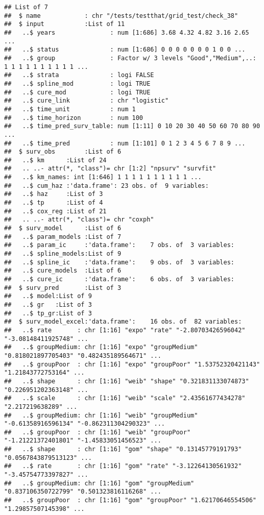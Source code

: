 \documentclass[
]{article}
\begin{document}
\begin{verbatim}
## List of 7
##  $ name            : chr "/tests/testthat/grid_test/check_38"
##  $ input           :List of 11
##   ..$ years               : num [1:686] 3.68 4.32 4.82 3.16 2.65 ...
##   ..$ status              : num [1:686] 0 0 0 0 0 0 0 1 0 0 ...
##   ..$ group               : Factor w/ 3 levels "Good","Medium",..: 1 1 1 1 1 1 1 1 1 1 ...
##   ..$ strata              : logi FALSE
##   ..$ spline_mod          : logi TRUE
##   ..$ cure_mod            : logi TRUE
##   ..$ cure_link           : chr "logistic"
##   ..$ time_unit           : num 1
##   ..$ time_horizon        : num 100
##   ..$ time_pred_surv_table: num [1:11] 0 10 20 30 40 50 60 70 80 90 ...
##   ..$ time_pred           : num [1:101] 0 1 2 3 4 5 6 7 8 9 ...
##  $ surv_obs        :List of 6
##   ..$ km      :List of 24
##   .. ..- attr(*, "class")= chr [1:2] "npsurv" "survfit"
##   ..$ km_names: int [1:646] 1 1 1 1 1 1 1 1 1 1 ...
##   ..$ cum_haz :'data.frame': 23 obs. of  9 variables:
##   ..$ haz     :List of 3
##   ..$ tp      :List of 4
##   ..$ cox_reg :List of 21
##   .. ..- attr(*, "class")= chr "coxph"
##  $ surv_model      :List of 6
##   ..$ param_models :List of 7
##   ..$ param_ic     :'data.frame':    7 obs. of  3 variables:
##   ..$ spline_models:List of 9
##   ..$ spline_ic    :'data.frame':    9 obs. of  3 variables:
##   ..$ cure_models  :List of 6
##   ..$ cure_ic      :'data.frame':    6 obs. of  3 variables:
##  $ surv_pred       :List of 3
##   ..$ model:List of 9
##   ..$ gr   :List of 3
##   ..$ tp_gr:List of 3
##  $ surv_model_excel:'data.frame':    16 obs. of  82 variables:
##   ..$ rate       : chr [1:16] "expo" "rate" "-2.80703426596042" "-3.08148411925748" ...
##   ..$ groupMedium: chr [1:16] "expo" "groupMedium" "0.818021897705403" "0.482435189564671" ...
##   ..$ groupPoor  : chr [1:16] "expo" "groupPoor" "1.53752320421143" "1.21843772753164" ...
##   ..$ shape      : chr [1:16] "weib" "shape" "0.321831133074873" "0.226951202363148" ...
##   ..$ scale      : chr [1:16] "weib" "scale" "2.43561677434278" "2.217219638289" ...
##   ..$ groupMedium: chr [1:16] "weib" "groupMedium" "-0.61358916596134" "-0.862311304290323" ...
##   ..$ groupPoor  : chr [1:16] "weib" "groupPoor" "-1.21221372401801" "-1.45833051456523" ...
##   ..$ shape      : chr [1:16] "gom" "shape" "0.13145779191793" "0.0567843879513123" ...
##   ..$ rate       : chr [1:16] "gom" "rate" "-3.12264130561932" "-3.45754773397827" ...
##   ..$ groupMedium: chr [1:16] "gom" "groupMedium" "0.837106350722799" "0.501323816116268" ...
##   ..$ groupPoor  : chr [1:16] "gom" "groupPoor" "1.62170646554506" "1.29857507145398" ...

\end{verbatim}
\end{document}
